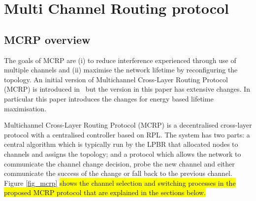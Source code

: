 \section{Multi Channel Routing protocol}
\label{MCRP}

\subsection{MCRP overview}
The goals of MCRP are (i) to reduce interference experienced through use of multiple channels and (ii) maximise the network lifetime by reconfiguring the topology. 
An initial version of Multichannel Cross-Layer Routing Protocol (MCRP) is introduced in~\cite{mcrp} but the version in this paper has extensive changes.  In particular this paper introduces the changes for energy based lifetime maximisation.

Multichannel Cross-Layer Routing Protocol (MCRP) \cite{mcrp} is a decentralised cross-layer protocol with a centralised controller based on RPL.  The system has two parts: a central algorithm which is typically run by the LPBR that allocated nodes to channels and assigns the topology; and a protocol which allows the network to communicate the channel change decision, probe the new channel and either communicate the success of the change or fall back to the previous channel. Figure \ref{fig_mcrp} \hl{shows the channel selection and switching processes in the proposed MCRP protocol that are explained in the sections below.}

